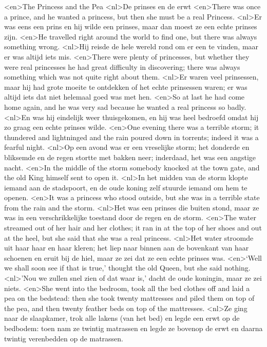 <en>The Princess and the Pea
<nl>De prinses en de erwt
<en>There was once a prince, and he wanted a princess, but then she must be a real Princess.
<nl>Er was eens een prins en hij wilde een prinses, maar dan moest ze een echte prinses zijn.
<en>He travelled right around the world to find one, but there was always something wrong.
<nl>Hij reisde de hele wereld rond om er een te vinden, maar er was altijd iets mis.
<en>There were plenty of princesses, but whether they were real princesses he had great difficulty in discovering; there was always something which was not quite right about them.
<nl>Er waren veel prinsessen, maar hij had grote moeite te ontdekken of het echte prinsessen waren; er was altijd iets dat niet helemaal goed was met hen.
<en>So at last he had come home again, and he was very sad because he wanted a real princess so badly.
<nl>En  was hij eindelijk weer thuisgekomen,  en hij was heel bedroefd omdat hij zo graag een echte prinses wilde.
<en>One evening there was a terrible storm; it thundered and lightninged and the rain poured down in torrents; indeed it was a fearful night.
<nl>Op een avond was er een vreselijke storm; het donderde en bliksemde en de regen stortte met bakken neer; inderdaad, het was een angstige nacht.
<en>In the middle of the storm somebody knocked at the town gate, and the old King himself sent to open it.
<nl>In het midden van de storm klopte iemand aan de stadspoort, en de oude koning zelf stuurde iemand om hem te openen.
<en>It was a princess who stood outside, but she was in a terrible state from the rain and the storm.
<nl>Het was een prinses die buiten stond, maar ze was in een verschrikkelijke toestand door de regen en de storm.
<en>The water streamed out of her hair and her clothes; it ran in at the top of her shoes and out at the heel, but she said that she was a real princess.
<nl>Het water stroomde uit haar haar en haar kleren; het liep naar binnen aan de bovenkant van haar schoenen en eruit bij de hiel, maar ze zei dat ze een echte prinses was.
<en>‘Well we shall soon see if that is true,’ thought the old Queen, but she said nothing.
<nl>'Nou we zullen snel zien of dat waar is,' dacht de oude koningin, maar ze zei niets.
<en>She went into the bedroom, took all the bed clothes off and laid a pea on the bedstead: then she took twenty mattresses and piled them on top of the pea, and then twenty feather beds on top of the mattresses.
<nl>Ze ging naar de slaapkamer, trok alle lakens (van het bed) en legde een erwt op de bedbodem: toen nam ze twintig matrassen en legde ze bovenop de erwt en daarna twintig verenbedden op de matrassen.

